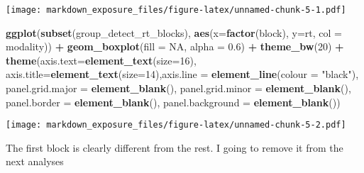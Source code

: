 \documentclass[]{article}
\newenvironment{Shaded}{\begin{snugshade}}{\end{snugshade}}
\newcommand{\DataTypeTok}[1]{\textcolor[rgb]{0.13,0.29,0.53}{#1}}
\newcommand{\DecValTok}[1]{\textcolor[rgb]{0.00,0.00,0.81}{#1}}
\newcommand{\FloatTok}[1]{\textcolor[rgb]{0.00,0.00,0.81}{#1}}
\newcommand{\KeywordTok}[1]{\textcolor[rgb]{0.13,0.29,0.53}{\textbf{#1}}}
\newcommand{\NormalTok}[1]{#1}
\newcommand{\OperatorTok}[1]{\textcolor[rgb]{0.81,0.36,0.00}{\textbf{#1}}}
\newcommand{\OtherTok}[1]{\textcolor[rgb]{0.56,0.35,0.01}{#1}}
\newcommand{\StringTok}[1]{\textcolor[rgb]{0.31,0.60,0.02}{#1}}
\begin{document}
\texttt{[image: markdown\_exposure\_files/figure-latex/unnamed-chunk-5-1.pdf]}

\begin{Shaded}
\begin{Highlighting}[]
\KeywordTok{ggplot}\NormalTok{(}\KeywordTok{subset}\NormalTok{(group_detect_rt_blocks), }\KeywordTok{aes}\NormalTok{(}\DataTypeTok{x=}\KeywordTok{factor}\NormalTok{(block), }\DataTypeTok{y=}\NormalTok{rt, }\DataTypeTok{col =}\NormalTok{ modality)) }\OperatorTok{+}\StringTok{ }
\StringTok{  }\KeywordTok{geom_boxplot}\NormalTok{(}\DataTypeTok{fill =} \OtherTok{NA}\NormalTok{, }\DataTypeTok{alpha =} \FloatTok{0.6}\NormalTok{) }\OperatorTok{+}
\StringTok{  }\KeywordTok{theme_bw}\NormalTok{(}\DecValTok{20}\NormalTok{) }\OperatorTok{+}\StringTok{  }\KeywordTok{theme}\NormalTok{(}\DataTypeTok{axis.text=}\KeywordTok{element_text}\NormalTok{(}\DataTypeTok{size=}\DecValTok{16}\NormalTok{), }\DataTypeTok{axis.title=}\KeywordTok{element_text}\NormalTok{(}\DataTypeTok{size=}\DecValTok{14}\NormalTok{),}\DataTypeTok{axis.line =} \KeywordTok{element_line}\NormalTok{(}\DataTypeTok{colour =} \StringTok{"black"}\NormalTok{),}
                        \DataTypeTok{panel.grid.major =} \KeywordTok{element_blank}\NormalTok{(),}
                        \DataTypeTok{panel.grid.minor =} \KeywordTok{element_blank}\NormalTok{(),}
                        \DataTypeTok{panel.border =} \KeywordTok{element_blank}\NormalTok{(),}
                        \DataTypeTok{panel.background =} \KeywordTok{element_blank}\NormalTok{())}
\end{Highlighting}
\end{Shaded}

\texttt{[image: markdown\_exposure\_files/figure-latex/unnamed-chunk-5-2.pdf]}

The first block is clearly different from the rest. I going to remove it
from the next analyses
\end{document}

